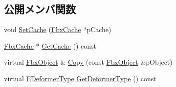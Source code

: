 \subsection*{公開メンバ関数}
\begin{DoxyCompactItemize}
\item 
void \hyperlink{class_fbx_vertex_cache_deformer_a773ff8a21ec72cf5e18f4b29ea86f7bc}{Set\+Cache} (\hyperlink{class_fbx_cache}{Fbx\+Cache} $\ast$p\+Cache)
\item 
\hyperlink{class_fbx_cache}{Fbx\+Cache} $\ast$ \hyperlink{class_fbx_vertex_cache_deformer_aa0888a4d84be4b936407daa3f5a1748b}{Get\+Cache} () const
\item 
virtual \hyperlink{class_fbx_object}{Fbx\+Object} \& \hyperlink{class_fbx_vertex_cache_deformer_add616b06af35726e53255d46a301aeb0}{Copy} (const \hyperlink{class_fbx_object}{Fbx\+Object} \&p\+Object)
\item 
virtual \hyperlink{class_fbx_deformer_a07e2cfb767191ba5c8799fdfbfe3eaf6}{E\+Deformer\+Type} \hyperlink{class_fbx_vertex_cache_deformer_ab213400e170fe58699649acaf652c787}{Get\+Deformer\+Type} () const
\end{DoxyCompactItemize}
